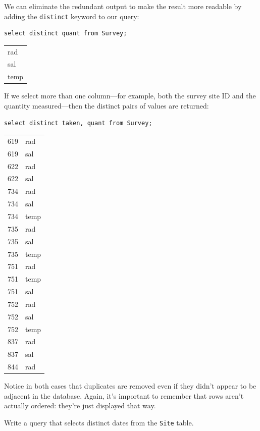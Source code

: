 \documentclass{book}
\begin{document}
We can eliminate the redundant output to make the result more readable
by adding the \texttt{distinct} keyword to our query:

\begin{verbatim}
select distinct quant from Survey;
\end{verbatim}

\begin{tabular}{l}
rad \\
sal \\
temp \\
\end{tabular}

If we select more than one column---for example, both the survey site ID
and the quantity measured---then the distinct pairs of values are
returned:

\begin{verbatim}
select distinct taken, quant from Survey;
\end{verbatim}

\begin{tabular}{ll}
619 & rad \\
619 & sal \\
622 & rad \\
622 & sal \\
734 & rad \\
734 & sal \\
734 & temp \\
735 & rad \\
735 & sal \\
735 & temp \\
751 & rad \\
751 & temp \\
751 & sal \\
752 & rad \\
752 & sal \\
752 & temp \\
837 & rad \\
837 & sal \\
844 & rad \\
\end{tabular}

Notice in both cases that duplicates are removed even if they didn't
appear to be adjacent in the database. Again, it's important to remember
that rows aren't actually ordered: they're just displayed that way.

\begin{challenge}
  Write a query that selects distinct dates from the \texttt{Site}
  table.
\end{challenge}
\end{document}
